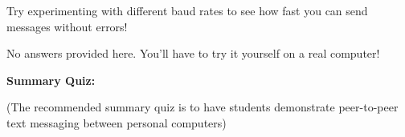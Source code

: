 Try experimenting with different baud rates to see how fast you can send messages without errors!







No answers provided here.  You'll have to try it yourself on a real computer!







\vfil \eject

\noindent
{\bf Summary Quiz:}

(The recommended summary quiz is to have students demonstrate peer-to-peer text messaging between personal computers)




